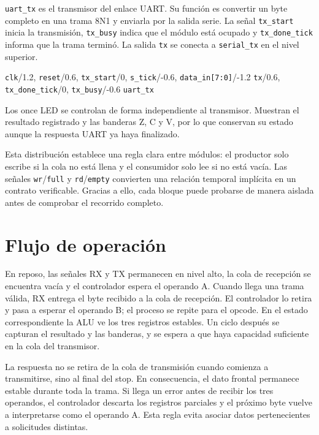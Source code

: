 \texttt{uart\_tx} es el transmisor del enlace UART. Su función es convertir un
byte completo en una trama 8N1 y enviarla por la salida serie. La señal
\texttt{tx\_start} inicia la transmisión, \texttt{tx\_busy} indica que el módulo
está ocupado y \texttt{tx\_done\_tick} informa que la trama terminó. La salida
\texttt{tx} se conecta a \texttt{serial\_tx} en el nivel superior.

{{\texttt{clk}}/1.2,
  {\texttt{reset}}/0.6,
  {\texttt{tx\_start}}/0,
  {\texttt{s\_tick}}/-0.6,
{\texttt{data\_in[7:0]}}/-1.2}
{{\texttt{tx}}/0.6,
  {\texttt{tx\_done\_tick}}/0,
{\texttt{tx\_busy}}/-0.6}
{\texttt{uart\_tx}}

Los once LED se controlan de forma independiente al transmisor.
Muestran el resultado registrado y las banderas Z, C y V, por lo que
conservan su estado aunque la respuesta UART ya haya finalizado.

Esta distribución establece una regla clara entre módulos: el
productor solo escribe si la cola no está llena y el consumidor solo
lee si no está vacía. Las señales \texttt{wr}/\texttt{full} y
\texttt{rd}/\texttt{empty} convierten una relación temporal implícita
en un contrato verificable. Gracias a ello, cada bloque puede
probarse de manera aislada antes de comprobar el recorrido completo.

\section{Flujo de operación}

En reposo, las señales RX y TX permanecen en nivel alto, la cola de
recepción se encuentra vacía y el controlador espera el operando A.
Cuando llega una trama válida, RX entrega el byte recibido a la cola
de recepción. El controlador lo retira y pasa a esperar el operando
B; el proceso se repite para el opcode. En el estado correspondiente
la ALU ve los tres registros estables. Un ciclo después se capturan
el resultado y las banderas, y se espera a que haya capacidad
suficiente en la cola del transmisor.

La respuesta no se retira de la cola de transmisión cuando comienza a
transmitirse, sino al final del stop. En consecuencia, el dato
frontal permanece estable durante toda la trama. Si llega un error
antes de recibir los tres operandos, el controlador descarta los
registros parciales y el próximo byte vuelve a interpretarse como el
operando A. Esta regla evita asociar datos pertenecientes a
solicitudes distintas.

